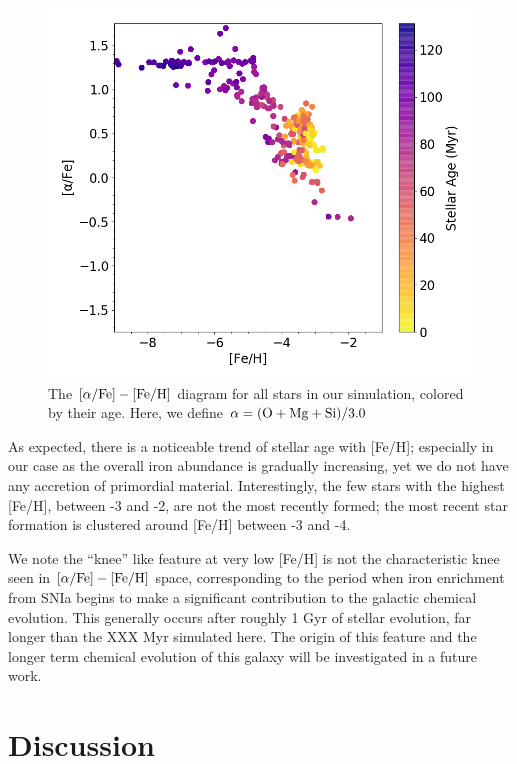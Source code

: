 \documentclass[twocolumn]{aastex61}
\begin{document}
\begin{figure}
\includegraphics[width=0.95\linewidth]{alpha_over_fe}
\caption{The $[\alpha / {\rm Fe}]-[\rm{Fe}/\rm{H}]$
diagram for all stars in our simulation, colored by their age. Here, we define $\alpha = (\rm{O} + \rm{Mg} + \rm{Si})/3.0$}
\label{fig:stellar_abundance}
\end{figure}

As expected, there is a noticeable trend of stellar age with [Fe/H]; especially in our case as the overall iron abundance is gradually increasing, yet we do not have any accretion of primordial material. Interestingly, the few stars with the highest [Fe/H], between -3 and -2, are not the most recently formed; the most recent star formation is clustered around [Fe/H] between -3 and -4.

We note the ``knee'' like feature at very low [Fe/H] is not the characteristic knee seen in $[\alpha / {\rm Fe}]-[\rm{Fe}/\rm{H}]$ space, corresponding to the period when iron enrichment from SNIa begins to make a significant contribution to the galactic chemical evolution. This generally occurs after roughly 1 Gyr of stellar evolution, far longer than the XXX Myr simulated here. The origin of this feature and the longer term chemical evolution of this galaxy will be investigated in a future work.

\section{Discussion}
\label{sec:discussion}
\end{document}
